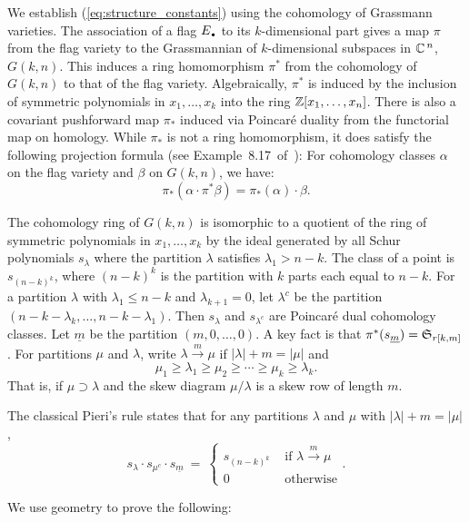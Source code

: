 We establish (\ref{eq:structure_constants}) using the cohomology
of Grassmann varieties.
The association of a flag $\Edot$ to its $k$-dimensional 
part gives a map $\pi$ from the flag variety to the
Grassmannian of $k$-dimensional subspaces in ${\Bbb C}\,^n$,
$G(k,n)$.
This induces a ring homomorphism $\pi^*$ from the 
cohomology of $G(k,n)$ to that of the flag 
variety.
Algebraically, $\pi^*$ is  induced by the inclusion of symmetric polynomials
in $x_1,\ldots,x_k$ into the ring ${\Bbb Z}[x_1,\ldots,x_n]$.
There is also a covariant pushforward map $\pi_*$
induced via Poincar\'e duality from the functorial map on homology.
While $\pi_*$ is not a ring homomorphism,
it does satisfy the following projection formula
(see Example~8.17~of~\cite{Fulton_intersection}):
For cohomology classes $\alpha$ on the flag variety and $\beta$ on
$G(k,n)$, we have:
\begin{equation}\label{eq:projection}
\pi_* (\alpha \cdot \pi^* \beta) = \pi_*(\alpha) \cdot \beta.
\end{equation}

The cohomology ring of $G(k,n)$ is isomorphic to 
a quotient of the ring of symmetric polynomials in 
$x_1,\ldots,x_k$ by the ideal generated by all Schur polynomials
$s_{\lambda}$ where the partition $\lambda$ satisfies
$\lambda_1 > n-k$.
The class of a point is $s_{(n-k)^k}$, where $(n{-}k)^k$ is 
the partition with $k$ parts  each equal to $n-k$.
For a partition $\lambda$ with $\lambda_1\leq n-k$ and 
$\lambda_{k+1} = 0$, let $\lambda^c$ be the partition
$(n-k-\lambda_k,\ldots,n-k-\lambda_1)$.
Then $s_\lambda$ and $s_{\lambda^c}$ are Poincar\'e dual 
cohomology classes.
Let $\underline{m}$ be the partition $(m,0,\ldots,0)$.
A key fact is that  $\pi^*(s_{\underline{m}}) = {\frak S}_{r[k,m]}$.
For partitions $\mu$ and $\lambda$, write 
$\lambda \stackrel{m}{\longrightarrow} \mu$ if $|\lambda|+m=|\mu|$
and 
$$
\mu_1\geq\lambda_1\geq\mu_2\geq\cdots\geq\mu_k\geq\lambda_k.
$$
That is, if $\mu\supset \lambda$ and the skew diagram 
$\mu/\lambda$ is a skew row of length $m$.

The classical Pieri's rule states that for any 
partitions $\lambda$ and $\mu$ with 
$|\lambda|+m = |\mu|$,
$$
s_{\lambda}\cdot s_{\mu^c} \cdot s_{\underline{m}}\  = \ \left\{
\begin{array}{ll} s_{(n-k)^k} & \mbox{ if }
\lambda \stackrel{m}{\longrightarrow} \mu\\
0 & \mbox{ otherwise}\end{array}
\right . .
$$

We use geometry to prove the following:



